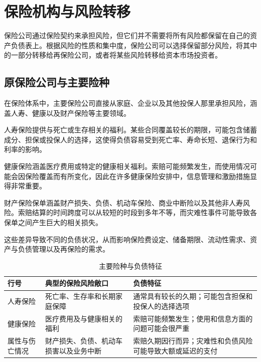 \section{保险机构与风险转移}

保险公司通过保险契约来承担风险，但它们并不需要将所有风险都保留在自己的资产负债表上。根据风险的性质和集中度，保险公司可以选择保留部分风险，将其中的一部分转移给再保险公司，或者将某些风险转移给资本市场投资者。

\subsection{原保险公司与主要险种}

在保险体系中，主要保险公司直接从家庭、企业以及其他投保人那里承担风险，涵盖人寿、健康以及财产保险等主要领域。

人寿保险提供与死亡或生存相关的福利。某些合同覆盖较长的期限，可能包含储蓄成分、担保或投保人的选择，这使得负债容易受到死亡率、寿命长短、退保行为和利率的影响。

健康保险涵盖医疗费用或特定的健康相关福利。索赔可能频繁发生，而使用情况可能会因保险覆盖而有所变化，因此在许多健康保险安排中，信息管理和激励措施显得非常重要。

财产保险保单涵盖财产损失、负债、机动车保险、商业中断险以及其他非人寿风险。索赔结算的时间跨度可以从较短的时段到多年不等，而灾难性事件可能导致各保单之间产生巨大的相关损失。

这些差异导致不同的负债状况，从而影响保险费设定、储备期限、流动性需求、资产与负债管理以及再保险的需求。



\begin{table}[H]

\centering

\caption{主要险种与负债特征}

\label{tab}

\begin{tabularx}{0.92\textwidth}{@{}p{} X X@{}}

\toprule

\textbf{行号} & \textbf{典型的保险风险敞口} & \textbf{负债特征} \\

\midrule

人寿保险
& 死亡率、生存率和长期家庭保障
& 通常具有较长的久期；可能包含担保和投保人的选择选项 \\

健康保险
& 医疗费用及与健康相关的福利
& 索赔可能频繁发生；使用和信息方面的问题可能会很严重 \\

属性与伤亡情况&财产损失、负债、机动车损害以及业务中断&索赔久期因行而异；灾难性和负债风险可能导致大额或延迟的支付\\

\bottomrule

\end{tabularx}

\end{table}


